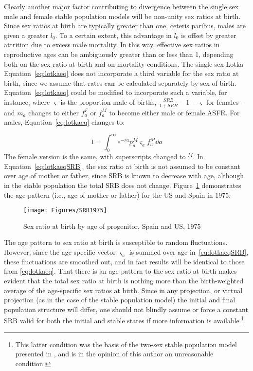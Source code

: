  \FloatBarrier
Clearly another major factor contributing to divergence between the single sex
male and female stable population models will be non-unity sex ratios at
birth. Since sex ratios at birth are typically greater than one, ceteris paribus, males
are given a greater $l_0$. To a certain extent, this advantage in $l_0$ is
offset by greater attrition due to excess male mortality. In this way, effective
sex ratios in reproductive ages can be ambiguously greater than or less than 1,
depending both on the sex ratio at birth and on mortality conditions. The
single-sex Lotka Equation~\eqref{eq:lotkaeq} does not incorporate a third
variable for the sex ratio at birth, since we assume that rates can be
calculated separately by sex of birth. Equation~\eqref{eq:lotkaeq} could be
modified to incorporate such a variable, for instance, where $\varsigma$ is the
proportion male of births, $\tfrac{SRB}{1+SRB}$ -- $1 - \varsigma$ for
females -- and $m_a$ changes to either $f_a^F$ or $f_a^M$ to become either male
or female ASFR. For males, Equation~\ref{eq:lotkaeq} changes to:

\begin{equation}
\label{eq:lotkaeqSRB}
1 = \int _0 ^\infty e^{-ra}p_a^M \varsigma_a f_a^M \dd a 
\end{equation}
The female version is the same, with superscripts changed to $^M$. In
Equation~\eqref{eq:lotkaeqSRB}, the sex ratio at birth is not assumed to
be constant over age of mother or father, since SRB is known to decrease with
age, although in the stable population the total SRB does not change. Figure~\ref{fig:SRB1975}
demonstrates the age pattern (i.e., age of mother or father) for the US and
Spain in 1975.

\begin{figure}[ht!]
        \centering  
          \caption{Sex ratio at birth by age of progenitor, Spain
          and US, 1975}
           \texttt{[image: Figures/SRB1975]}
          \label{fig:SRB1975}
\end{figure}

The age pattern to sex ratio at birth is susceptible to random
fluctuations. However, since the age-specific vector $\varsigma _a$ is summed
over age in~\eqref{eq:lotkaeqSRB}, these fluctuations are smoothed out, and in
fact results will be identical to those from \eqref{eq:lotkaeq}. That there is
an age pattern to the sex ratio at birth makes evident that the total sex ratio 
at birth is nothing more than the birth-weighted
average of the age-specific sex ratios at birth. Since in any projection, or virtual projection
(as in the case of the stable population model) the initial and final population 
structure will differ, one should not blindly assume or force a constant SRB valid 
for both the initial and stable states
if more information is available.\footnote{This latter condition was the basis
of the two-sex stable population model presented in \citet{mitra1982alternative,mitra1978derivation,mitra1976effect}, and is in the
opinion of this author an unreasonable condition.}

